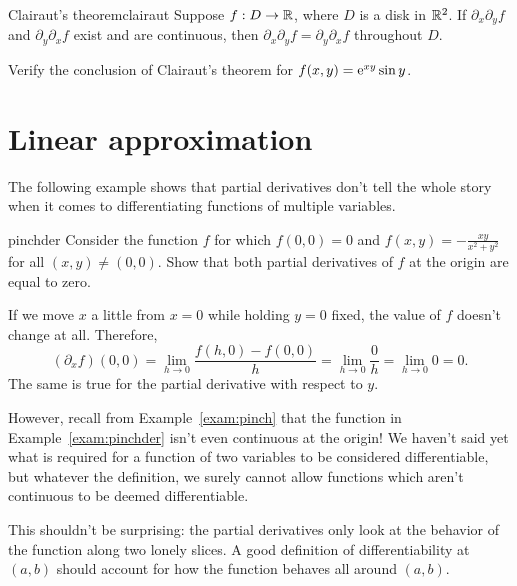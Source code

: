 \documentclass{watsonbook}
\begin{document}
\begin{theo}{Clairaut's theorem}{clairaut}
  Suppose $f:D \to \mathbb{R}$, where $D$ is a disk in $\mathbb{R}^2$. If
  $\partial_x \partial_y f$ and $\partial_y \partial_x f$ exist and
  are continuous, then $\partial_x \partial_y f = \partial_y
  \partial_x f$ throughout $D$. 
\end{theo}

\begin{exercise}{}{}
  Verify the conclusion of Clairaut's theorem for $f(x,y) = \operatorname{e}^{xy}
  \sin y$. 
\end{exercise}

\section{Linear approximation} \label{sec:linapprox} 


The following example shows that partial derivatives don't tell the
whole story when it comes to differentiating functions of multiple
variables.

\begin{example}{}{pinchder}
  Consider the function $f$ for which $f(0,0)=0$ and $f(x,y) =
  -\frac{xy}{x^2 + y^2}$ for all $(x,y) \neq (0,0)$. Show that both
  partial derivatives of $f$ at the origin are equal to zero. 
  \end{example}

  \begin{solution}
    If we move $x$ a little from $x=0$ while holding $y=0$ fixed, the
    value of $f$ doesn't change at all. Therefore,
    \[
      (\partial_x f)(0,0) = \lim_{h \to 0} \frac{f(h,0) - f(0,0)}{h} =
      \lim_{h \to 0} \frac{0}{h} =  \lim_{h \to 0} 0 = 0. 
    \]
    The same is true for the partial derivative with respect to $y$. 
  \end{solution}

  However, recall from Example~\ref{exam:pinch} that the function in
  Example~\ref{exam:pinchder} isn't even continuous at the origin! We
  haven't said yet what is required for a function of two variables to be
  considered differentiable, but whatever the definition, we surely cannot allow
  functions which aren't continuous to be deemed differentiable. 

  This shouldn't be surprising: the partial derivatives only look at
  the behavior of the function along two lonely slices. A good
  definition of differentiability at $(a,b)$ should account for how the
  function behaves all around $(a,b)$.
\end{document}
